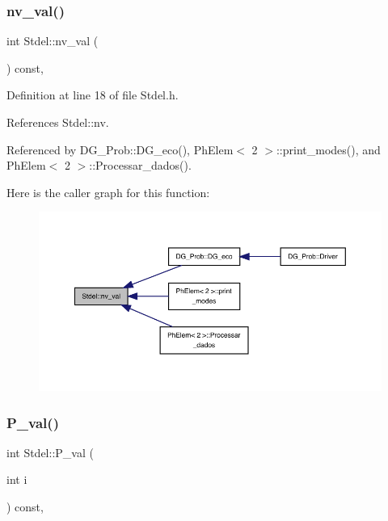 \subsubsection{\texorpdfstring{nv\+\_\+val()}{nv\_val()}}
{\footnotesize\ttfamily int Stdel\+::nv\+\_\+val (\begin{DoxyParamCaption}{ }\end{DoxyParamCaption}) const\hspace{0.3cm}{\ttfamily [inline]}, {\ttfamily [inherited]}}



Definition at line 18 of file Stdel.\+h.



References Stdel\+::nv.



Referenced by D\+G\+\_\+\+Prob\+::\+D\+G\+\_\+eco(), Ph\+Elem$<$ 2 $>$\+::print\+\_\+modes(), and Ph\+Elem$<$ 2 $>$\+::\+Processar\+\_\+dados().

Here is the caller graph for this function\+:
\nopagebreak
\begin{figure}[H]
\begin{center}
\leavevmode
\includegraphics[width=350pt]{classStdel_ae2ab461d1bc8d9f6006665fe03684845_icgraph}
\end{center}
\end{figure}
\mbox{\label{classStdel_a701c7d5595d4f6632333c4202898983b}} 
\subsubsection{\texorpdfstring{P\+\_\+val()}{P\_val()}}
{\footnotesize\ttfamily int Stdel\+::\+P\+\_\+val (\begin{DoxyParamCaption}\item[{int}]{i }\end{DoxyParamCaption}) const\hspace{0.3cm}{\ttfamily [inline]}, {\ttfamily [inherited]}}



